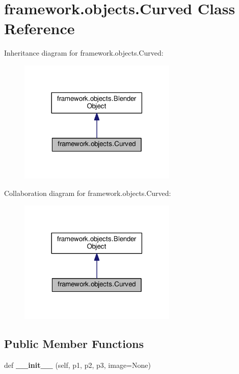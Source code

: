 \hypertarget{classframework_1_1objects_1_1Curved}{}\section{framework.\+objects.\+Curved Class Reference}
\label{classframework_1_1objects_1_1Curved}


Inheritance diagram for framework.\+objects.\+Curved\+:
\nopagebreak
\begin{figure}[H]
\begin{center}
\leavevmode
\includegraphics[width=213pt]{classframework_1_1objects_1_1Curved__inherit__graph}
\end{center}
\end{figure}


Collaboration diagram for framework.\+objects.\+Curved\+:
\nopagebreak
\begin{figure}[H]
\begin{center}
\leavevmode
\includegraphics[width=213pt]{classframework_1_1objects_1_1Curved__coll__graph}
\end{center}
\end{figure}
\subsection*{Public Member Functions}
\begin{DoxyCompactItemize}
\item 
def {\bfseries \+\_\+\+\_\+init\+\_\+\+\_\+} (self, p1, p2, p3, image=None)\hypertarget{classframework_1_1objects_1_1Curved_acf37a88ee28b6727721ee4cf0e8bac05}{}\label{classframework_1_1objects_1_1Curved_acf37a88ee28b6727721ee4cf0e8bac05}

\end{DoxyCompactItemize}
